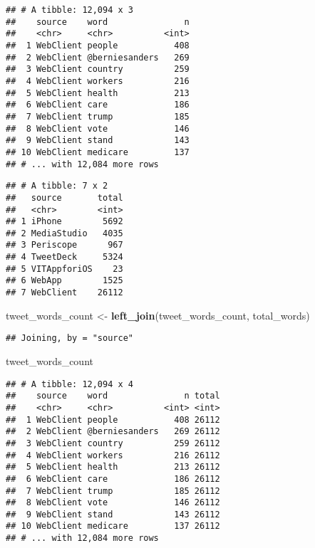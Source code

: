 \documentclass[]{article}
\newenvironment{Shaded}{\begin{snugshade}}{\end{snugshade}}
\newcommand{\DataTypeTok}[1]{\textcolor[rgb]{0.13,0.29,0.53}{#1}}
\newcommand{\KeywordTok}[1]{\textcolor[rgb]{0.13,0.29,0.53}{\textbf{#1}}}
\newcommand{\NormalTok}[1]{#1}
\newcommand{\OperatorTok}[1]{\textcolor[rgb]{0.81,0.36,0.00}{\textbf{#1}}}
\newcommand{\StringTok}[1]{\textcolor[rgb]{0.31,0.60,0.02}{#1}}
\begin{document}
\begin{verbatim}
## # A tibble: 12,094 x 3
##    source    word               n
##    <chr>     <chr>          <int>
##  1 WebClient people           408
##  2 WebClient @berniesanders   269
##  3 WebClient country          259
##  4 WebClient workers          216
##  5 WebClient health           213
##  6 WebClient care             186
##  7 WebClient trump            185
##  8 WebClient vote             146
##  9 WebClient stand            143
## 10 WebClient medicare         137
## # ... with 12,084 more rows
\end{verbatim}

\begin{Shaded}
\end{Shaded}

\begin{verbatim}
## # A tibble: 7 x 2
##   source       total
##   <chr>        <int>
## 1 iPhone        5692
## 2 MediaStudio   4035
## 3 Periscope      967
## 4 TweetDeck     5324
## 5 VITAppforiOS    23
## 6 WebApp        1525
## 7 WebClient    26112
\end{verbatim}

\begin{Shaded}
\begin{Highlighting}[]
\NormalTok{tweet_words_count <-}\StringTok{ }\KeywordTok{left_join}\NormalTok{(tweet_words_count, total_words)}
\end{Highlighting}
\end{Shaded}

\begin{verbatim}
## Joining, by = "source"
\end{verbatim}

\begin{Shaded}
\begin{Highlighting}[]
\NormalTok{tweet_words_count}
\end{Highlighting}
\end{Shaded}

\begin{verbatim}
## # A tibble: 12,094 x 4
##    source    word               n total
##    <chr>     <chr>          <int> <int>
##  1 WebClient people           408 26112
##  2 WebClient @berniesanders   269 26112
##  3 WebClient country          259 26112
##  4 WebClient workers          216 26112
##  5 WebClient health           213 26112
##  6 WebClient care             186 26112
##  7 WebClient trump            185 26112
##  8 WebClient vote             146 26112
##  9 WebClient stand            143 26112
## 10 WebClient medicare         137 26112
## # ... with 12,084 more rows
\end{verbatim}
\end{document}
